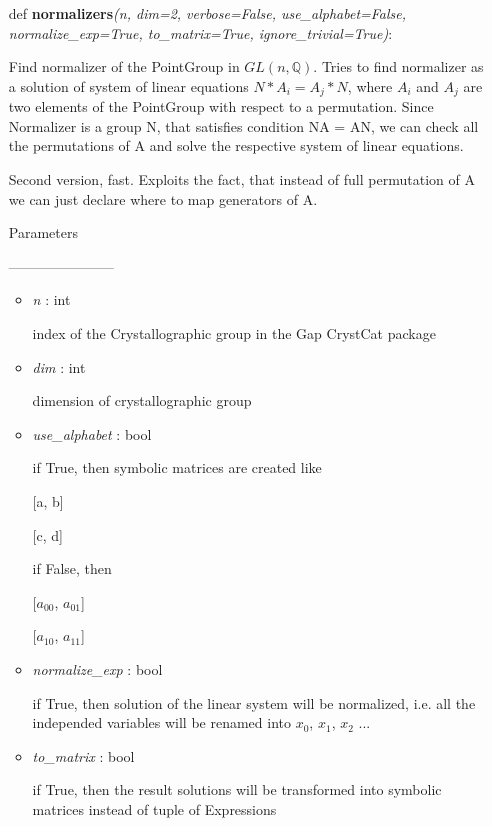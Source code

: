 \documentclass[a4paper,12pt]{amsart}
\theoremstyle{definition}
\begin{document}
	\begin{itemize}
		\item[def] \textbf{normalizers}\textit{(n, dim=2, verbose=False, use\_alphabet=False,
		normalize\_exp=True, to\_matrix=True, ignore\_trivial=True)}:
		
		Find normalizer of the PointGroup in $GL(n, \mathbb{Q})$. Tries to find normalizer as a solution of system of linear equations $N*A_i = A_j*N$, where $A_i$ and $A_j$ are	two elements of the PointGroup with respect to a permutation. Since
		Normalizer is a group N, that satisfies condition NA = AN,
		we can check all the permutations of A and solve the respective system
		of linear equations.
		
		Second version, fast. Exploits the fact, that instead of full permutation of
		A we can just declare where to map generators of A.
		
		Parameters
	
		-----------------------
	
		\begin{itemize}
			\item \textit{n} : int
			
			index of the Crystallographic group in the Gap CrystCat package
			
			\item \textit{dim} : int
			
			dimension of crystallographic group
			
			\item \textit{use\_alphabet} : bool
			
			if True, then symbolic matrices are created like
			\begin{center}
				[a, b] 
				
				[c, d]		
			\end{center}
			if False, then
			\begin{center}
				[$a_{00}$, $a_{01}$] 
				
				[$a_{10}$, $a_{11}$]
			\end{center}
		
			\item \textit{normalize\_exp} : bool
		
			if True, then solution of the linear system will be
			normalized, i.e. all the independed variables will be
			renamed into $x_0$, $x_1$, $x_2$ ...
			
			\item \textit{to\_matrix} : bool
		
			if True, then the result solutions will be transformed
			into symbolic matrices instead of tuple of Expressions
			

\end{itemize}
\end{itemize}
\end{document}
